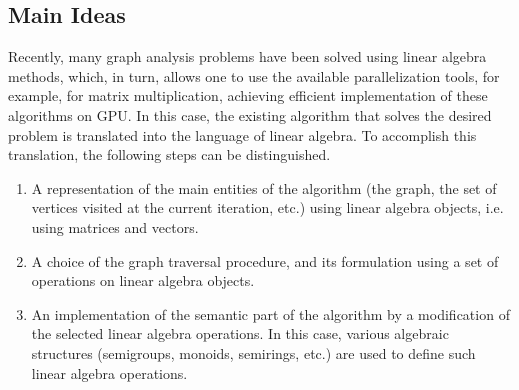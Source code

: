 \subsection{Main Ideas}
Recently, many graph analysis problems have been solved using linear algebra methods, which, in turn, allows one to use the available parallelization tools, for example, for matrix multiplication, achieving efficient implementation of these algorithms on GPU. In this case, the existing algorithm that solves the desired problem is translated into the language of linear algebra. To accomplish this translation, the following steps can be distinguished.

\begin{enumerate}
    \item A representation of the main entities of the algorithm (the graph, the set of vertices visited at the current iteration, etc.) using linear algebra objects, i.e. using matrices and vectors. 
    \item A choice of the graph traversal procedure, and its formulation using a set of operations on linear algebra objects.
    \item An implementation of the semantic part of the algorithm by a modification of the selected linear algebra operations. In this case, various algebraic structures (semigroups, monoids, semirings, etc.) are used to define such linear algebra operations.
\end{enumerate}

